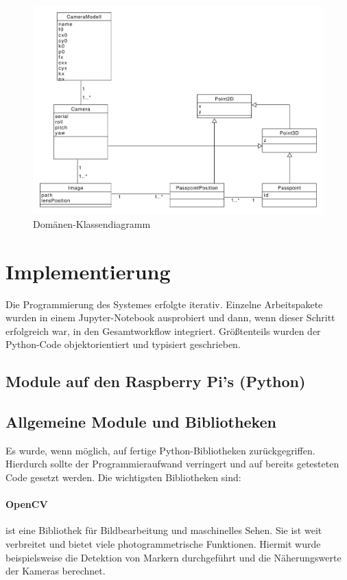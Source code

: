 \documentclass[./00PhotoBox.tex]{subfiles}
\begin{document}
\begin{figure}
    \centering
    \includegraphics[width=1\textwidth]{./img/uml/uml_domain.pdf}
    \centering
    \caption{Domänen-Klassendiagramm} %
    \label{img:dokladia} %
\end{figure}

\section{Implementierung}
\label{sec:Implementierung}


Die Programmierung des Systemes erfolgte iterativ. Einzelne Arbeitspakete wurden in einem Jupyter-Notebook ausprobiert und dann, wenn dieser Schritt erfolgreich war, in den Gesamtworkflow integriert. Größtenteils wurden der Python-Code objektorientiert und typisiert geschrieben.



\subsection{Module auf den Raspberry Pi's (Python)}

\subsection{Allgemeine Module und Bibliotheken}
Es wurde, wenn möglich, auf fertige Python-Bibliotheken zurückgegriffen. Hierdurch sollte der Programmieraufwand verringert und auf bereits getesteten Code gesetzt werden. Die wichtigsten Bibliotheken sind:

\paragraph{OpenCV}
ist eine Bibliothek für Bildbearbeitung und maschinelles Sehen. Sie ist weit verbreitet und bietet viele photogrammetrische Funktionen. Hiermit wurde beispielsweise die Detektion von Markern durchgeführt und die Näherungswerte der Kameras berechnet.
\end{document}
